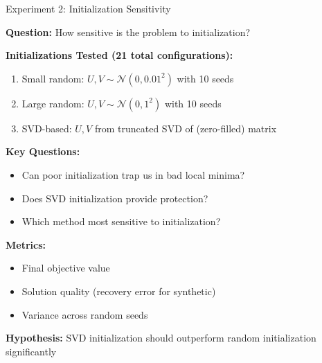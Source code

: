 \documentclass[aspectratio=169,usenames,dvipsnames]{beamer}
\begin{document}
\begin{frame}{Experiment 2: Initialization Sensitivity}

\textbf{Question:} How sensitive is the problem to initialization?

\vspace{0.3cm}

\textbf{Initializations Tested (21 total configurations):}
\begin{enumerate}
  \item Small random: $U, V \sim \mathcal{N}(0, 0.01^2)$ with 10 seeds
  \item Large random: $U, V \sim \mathcal{N}(0, 1^2)$ with 10 seeds
  \item SVD-based: $U, V$ from truncated SVD of (zero-filled) matrix
\end{enumerate}

\vspace{0.3cm}

\textbf{Key Questions:}
\begin{itemize}
  \item Can poor initialization trap us in bad local minima?
  \item Does SVD initialization provide protection?
  \item Which method most sensitive to initialization?
\end{itemize}

\vspace{0.3cm}

\textbf{Metrics:}
\begin{itemize}
  \item Final objective value
  \item Solution quality (recovery error for synthetic)
  \item Variance across random seeds
\end{itemize}

\vspace{0.3cm}

\textbf{Hypothesis:} SVD initialization should outperform random initialization significantly

\end{frame}
\end{document}
